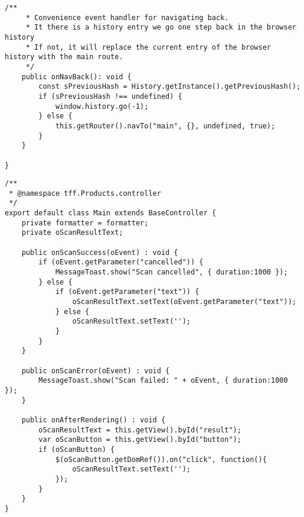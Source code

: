 \begin{mdframed}[backgroundcolor=mygrey2, leftmargin=0.5cm, hidealllines=true, innerleftmargin=3pt, innerrightmargin=0cm, innertopmargin=0cm, innerbottommargin=-3cm, splitbottomskip=0]
\begin{lstlisting}[emph={event, UI5Event, listItem, detail, path}, caption=Base Controller der Anwendung]
	/**
	 * Convenience event handler for navigating back.
	 * It there is a history entry we go one step back in the browser history
	 * If not, it will replace the current entry of the browser history with the main route.
	 */
	public onNavBack(): void {
		const sPreviousHash = History.getInstance().getPreviousHash();
		if (sPreviousHash !== undefined) {
			window.history.go(-1);
		} else {
			this.getRouter().navTo("main", {}, undefined, true);
		}
	}

}
\end{lstlisting}
\end{mdframed}


\begin{mdframed}[backgroundcolor=mygrey2, leftmargin=0.5cm, hidealllines=true, innerleftmargin=3pt, innerrightmargin=0cm, innertopmargin=0cm, innerbottommargin=-3cm, splitbottomskip=0]
\begin{lstlisting}[emph={event, UI5Event, listItem, detail, path}, caption=Barcode Controller der Anwendung]
/**
 * @namespace tff.Products.controller
 */
export default class Main extends BaseController {
	private formatter = formatter;
	private oScanResultText;

	public onScanSuccess(oEvent) : void {
		if (oEvent.getParameter("cancelled")) {
			MessageToast.show("Scan cancelled", { duration:1000 });
		} else {
			if (oEvent.getParameter("text")) {
				oScanResultText.setText(oEvent.getParameter("text"));
			} else {
				oScanResultText.setText('');
			}
		}
	}

	public onScanError(oEvent) : void {
		MessageToast.show("Scan failed: " + oEvent, { duration:1000 });
	}

	public onAfterRendering() : void {
		oScanResultText = this.getView().byId("result");
		var oScanButton = this.getView().byId("button");
		if (oScanButton) {
			$(oScanButton.getDomRef()).on("click", function(){
				oScanResultText.setText('');
			});
		}
	}
}
\end{lstlisting}
\end{mdframed}



